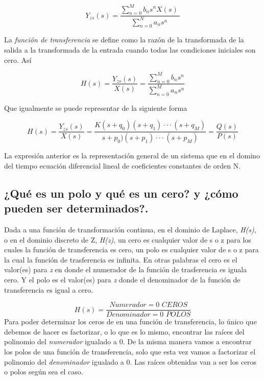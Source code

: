 \begin{equation}
	Y_{zs}(s)=\frac{\sum_{n=0}^M b_ns^nX(s)\ }{\sum_{n=0}^Na_ns^n\ }
\end{equation}

\noindent La \textit{función de transferencia} se define como la razón de la transformada de la salida a la transformada de la entrada cuando todas las condiciones iniciales son cero. Así

\begin{equation}
	H(s)=\frac{Y_{zs}(s)}{X(s)} = \frac{\sum_{n=0}^M b_ns^n}{\sum_{n=0}^M a_ns^n}
\end{equation}

\noindent Que igualmente se puede representar de la siguiente forma

\begin{equation}
	H(s)=\frac{Y_{zs}(s)}{X(s)} = \frac{K(s+q_0)(s+q_1)···(s+q_M)}{s+p_0)(s+p_1)···(s+p_M)} = \frac{Q(s)}{P(s)}
\end{equation}

\noindent La expresión anterior es la representación general de un sistema que en el domino del tiempo ecuación diferencial lineal de coeficientes constantes de orden N.
\subsection{¿Qué es un polo y qué es un cero? y ¿cómo pueden ser determinados?.}


Dada a una función de transformación continua, en el dominio de Laplace, \textit{H(s)}, o en el dominio discreto de Z, \textit{H(z)}, un cero es cualquier valor de s o z para los cuales la función de transferencia es cero, un polo es cualquier valor de s o z para la cual la función de trasferencia es infinita.\newline
En otras palabras el cero es el valor(es) para \textit{z} en donde el numerador de la función de trasferencia es iguala cero. Y el polo es el valor(es) para \textit{z} donde el denominador de la función de transferencia es igual a cero.

\[
H(s) = \frac{Numerador = 0 \textit{ CEROS} }{Denominador = 0 \textit{ POLOS}}
\]
\newline
Para poder determinar los ceros de en una función de transferencia, lo único que debemos de hacer es factorizar, o lo que es lo mismo, encontrar las raíces del polinomio del \textit{numerador} igualado a 0.\newline
De la misma manera vamos a encontrar los polos de una función de transferencia, solo que esta vez vamos a factorizar el polinomio del \textit{denominador} igualado a 0. Las raíces obtenidas van a ser los ceros o polos según sea el caso.\\


